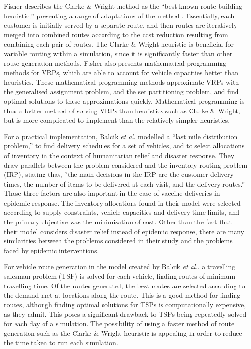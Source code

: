 Fisher describes the Clarke \& Wright method as the ``best known route building heuristic,'' presenting a range of adaptations of the method \cite{fisher1995vehicle}. Essentially, each customer is initially served by a separate route, and then routes are iteratively merged into combined routes according to the cost reduction resulting from combining each pair of routes. The Clarke \& Wright heuristic is beneficial for variable routing within a simulation, since it is significantly faster than other route generation methods. Fisher also presents mathematical programming methods for VRPs, which are able to account for vehicle capacities better than heuristics. These mathematical programming methods approximate VRPs with the generalised assignment problem, and the set partitioning problem, and find optimal solutions to these approximations quickly. Mathematical programming is thus a better method of solving VRPs than heuristics such as Clarke \& Wright, but is more complicated to implement than the relatively simpler heuristics.

For a practical implementation, Balcik \textit{et al.} \cite{balcik2008last} modelled a ``last mile distribution problem,'' to find delivery schedules for a set of vehicles, and to select allocations of inventory in the context of humanitarian relief and disaster response. They draw parallels between the problem considered and the inventory routing problem (IRP), stating that, ``the main decisions in the IRP are the customer delivery times, the number of items to be delivered at each visit, and the delivery routes.'' These three factors are also important in the case of vaccine deliveries in epidemic response. The inventory allocations found in their model were selected according to supply constraints, vehicle capacities and delivery time limits, and the primary objective was the minimisation of cost. Other than the fact that their model considers disaster relief instead of epidemic response, there are many similarities between the problems considered in their study and the problems faced by epidemic interventions. 

For vehicle route generation in the model created by Balcik \textit{et al.}, a travelling salesman problem (TSP) is solved for each vehicle, finding routes of minimum travelling time. Of the routes generated, the best routes are selected according to the demand met at locations along the route. This is a good method for finding routes, although finding optimal solutions for TSPs is computationally expensive, as they admit. This poses a significant drawback to TSPs being repeatedly solved for each day of a simulation. The possibility of using a faster method of route generation such as the Clarke \& Wright heuristic is appealing in order to reduce the time taken to run each simulation.


